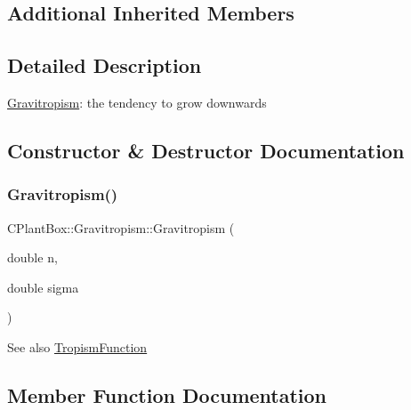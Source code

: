 \subsection*{Additional Inherited Members}


\subsection{Detailed Description}
\hyperlink{classCPlantBox_1_1Gravitropism}{Gravitropism}\+: the tendency to grow downwards 

\subsection{Constructor \& Destructor Documentation}
\mbox{\label{classCPlantBox_1_1Gravitropism_a2a6a57c372c3257e72156160c8fc5e6b}} 
\subsubsection{\texorpdfstring{Gravitropism()}{Gravitropism()}}
{\footnotesize\ttfamily C\+Plant\+Box\+::\+Gravitropism\+::\+Gravitropism (\begin{DoxyParamCaption}\item[{double}]{n,  }\item[{double}]{sigma }\end{DoxyParamCaption})\hspace{0.3cm}{\ttfamily [inline]}}

\begin{DoxySeeAlso}{See also}
\hyperlink{classCPlantBox_1_1TropismFunction}{Tropism\+Function} 
\end{DoxySeeAlso}


\subsection{Member Function Documentation}
\mbox{\label{classCPlantBox_1_1Gravitropism_a4471a30549db829fe19a91650ca8f87e}} 
